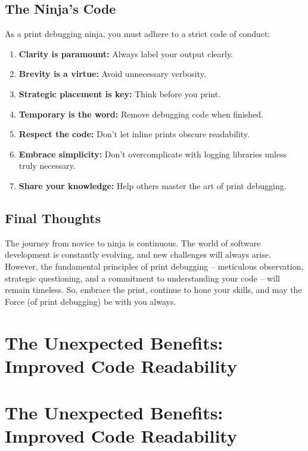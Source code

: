 \documentclass{article}
\begin{document}
{{{{\subsection*{The Ninja's Code}

As a print debugging ninja, you must adhere to a strict code of conduct:

\begin{enumerate}
    \item \textbf{Clarity is paramount:} Always label your output clearly.
    \item \textbf{Brevity is a virtue:} Avoid unnecessary verbosity.
    \item \textbf{Strategic placement is key:} Think before you print.
    \item \textbf{Temporary is the word:} Remove debugging code when finished.
    \item \textbf{Respect the code:} Don't let inline prints obscure readability.
    \item \textbf{Embrace simplicity:} Don't overcomplicate with logging libraries unless truly necessary.
    \item \textbf{Share your knowledge:} Help others master the art of print debugging.
\end{enumerate}

\subsection*{Final Thoughts}

The journey from novice to ninja is continuous. The world of software development is constantly evolving, and new challenges will always arise. However, the fundamental principles of print debugging – meticulous observation, strategic questioning, and a commitment to understanding your code – will remain timeless. So, embrace the print, continue to hone your skills, and may the Force (of print debugging) be with you always.

\newpage

\section*{The Unexpected Benefits: Improved Code Readability} %
\label{chapter-10-9-The_Unexpected_Benefits__Improved_Code_R}

\section*{The Unexpected Benefits: Improved Code Readability}

}}}}
\end{document}
